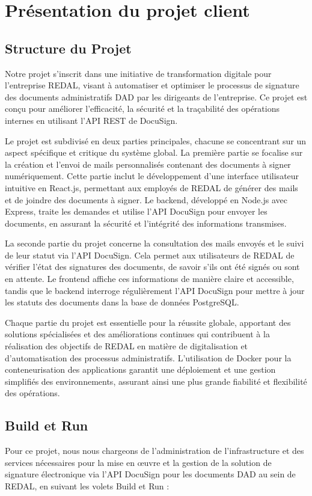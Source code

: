 \newpage
\section{Présentation du projet client}
\subsection{Structure du Projet}
Notre projet s’inscrit dans une initiative de transformation digitale pour l’entreprise REDAL, visant à automatiser et optimiser le processus de signature des documents administratifs DAD par les dirigeants de l’entreprise. Ce projet est conçu pour améliorer l’efficacité, la sécurité et la traçabilité des opérations internes en utilisant l’API REST de DocuSign.

Le projet est subdivisé en deux parties principales, chacune se concentrant sur un aspect spécifique et critique du système global. La première partie se focalise sur la création et l’envoi de mails personnalisés contenant des documents à signer numériquement. Cette partie inclut le développement d'une interface utilisateur intuitive en React.js, permettant aux employés de REDAL de générer des mails et de joindre des documents à signer. Le backend, développé en Node.js avec Express, traite les demandes et utilise l'API DocuSign pour envoyer les documents, en assurant la sécurité et l’intégrité des informations transmises.

La seconde partie du projet concerne la consultation des mails envoyés et le suivi de leur statut via l'API DocuSign. Cela permet aux utilisateurs de REDAL de vérifier l'état des signatures des documents, de savoir s'ils ont été signés ou sont en attente. Le frontend affiche ces informations de manière claire et accessible, tandis que le backend interroge régulièrement l’API DocuSign pour mettre à jour les statuts des documents dans la base de données PostgreSQL.

Chaque partie du projet est essentielle pour la réussite globale, apportant des solutions spécialisées et des améliorations continues qui contribuent à la réalisation des objectifs de REDAL en matière de digitalisation et d'automatisation des processus administratifs. L’utilisation de Docker pour la conteneurisation des applications garantit une déploiement et une gestion simplifiés des environnements, assurant ainsi une plus grande fiabilité et flexibilité des opérations.
\subsection{Build et Run}
Pour ce projet, nous nous chargeons de l’administration de l’infrastructure et des services nécessaires pour la mise en œuvre et la gestion de la solution de signature électronique via l’API DocuSign pour les documents DAD au sein de REDAL, en suivant les volets Build et Run :

